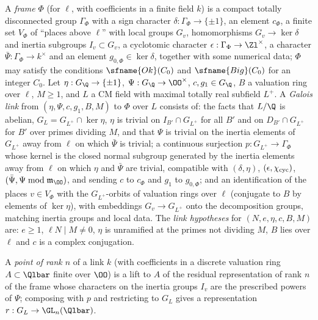 \begin{definition}\label{pf:modularity:link}
A \emph{frame} $\Phi$ (for $\ell$, with coefficients in a finite field $k$) is a compact totally disconnected group
$\Gamma_\Phi$ with a sign character $\delta:\Gamma_\Phi\to\{\pm1\}$, an element $c_\Phi$, a finite set $V_\Phi$ of
``places above $\ell$'' with local groups $G_v$, homomorphisms $G_v\to\ker\delta$ and inertia subgroups $I_v\subset G_v$,
a cyclotomic character $\epsilon:\Gamma_\Phi\to\Zl^\times$, a character $\bar\Psi:\Gamma_\Phi\to k^\times$ and an element
$g_{0,\Phi}\in\ker\delta$, together with some numerical data; $\Phi$ may satisfy the conditions $\sfname{Ok}(C_0)$ and
$\sfname{Big}(C_0)$ for an integer $C_0$. Let $\eta:G_\Q\to\{\pm1\}$, $\Psi:G_\Q\to\OO^\times$, $c,g_1\in G_\Q$, $B$ a
valuation ring over $\ell$, $M\ge1$, and $L$ a CM field with maximal totally real subfield $L^+$. A \emph{Galois link}
from $(\eta,\Psi,c,g_1,B,M)$ to $\Phi$ over $L$ consists of: the facts that $L/\Q$ is abelian, $G_L=G_{L^+}\cap\ker\eta$,
$\eta$ is trivial on $I_{B'}\cap G_{L^+}$ for all $B'$ and on $D_{B'}\cap G_{L^+}$ for $B'$ over primes dividing $M$,
and that $\Psi$ is trivial on the inertia elements of $G_{L^+}$ away from $\ell$ on which $\bar\Psi$ is trivial; a
continuous surjection $p:G_{L^+}\to\Gamma_\Phi$ whose kernel is the closed normal subgroup generated by the inertia
elements away from $\ell$ on which $\eta$ and $\bar\Psi$ are trivial, compatible with $(\delta,\eta)$,
$(\epsilon,\chi_{\mathrm{cyc}})$, $(\bar\Psi,\Psi\bmod\mathfrak m_\OO)$, and sending $c$ to $c_\Phi$ and $g_1$ to $g_{0,\Phi}$;
and an identification of the places $v\in V_\Phi$ with the $G_{L^+}$-orbits of valuation rings over $\ell$ (conjugate
to $B$ by elements of $\ker\eta$), with embeddings $G_v\to G_{L^+}$ onto the decomposition groups, matching inertia
groups and local data. The \emph{link hypotheses} for $(N,e,\eta,c,B,M)$ are: $e\ge1$, $\ell N\mid M\ne0$, $\eta$ is
unramified at the primes not dividing $M$, $B$ lies over $\ell$ and $c$ is a complex conjugation.
\end{definition}

A \emph{point of rank $n$} of a link $k$ (with coefficients in a discrete valuation ring $A\subset\Qlbar$ finite over
$\OO$) is a lift to $A$ of the residual representation of rank $n$ of the frame whose characters on the inertia groups
$I_v$ are the prescribed powers of $\Psi$; composing with $p$ and restricting to $G_L$ gives a representation
$r:G_L\to\GL_n(\Qlbar)$.

